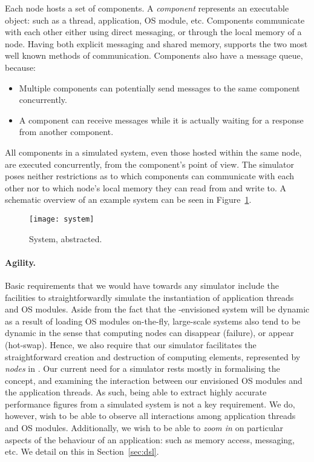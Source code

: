 Each node hosts a set of components.
A \emph{component} represents an executable object: such as a thread, application, OS module, etc.
Components communicate with each other either using direct messaging, or through the local memory of a node.
Having both explicit messaging and shared memory,%
\soosim supports the two most well known methods of communication.
Components also have a message queue, because:
\begin{itemize}
  \item Multiple components can potentially send messages to the same component concurrently.
  \item A component can receive messages while it is actually waiting for a response from another component.
\end{itemize}
All components in a simulated system, even those hosted within the same node, are executed concurrently, from the component's point of view.
The simulator poses neither restrictions as to which components can communicate with each other nor to which node's local memory they can read from and write to.
A schematic overview of an example system can be seen in Figure~\ref{fig:system}.

\begin{figure}
\centering
%
\texttt{[image: system]}
\caption{System, abstracted.}
\label{fig:system}
\end{figure}

\paragraph{Agility.}
Basic requirements that we would have towards any simulator include the facilities to straightforwardly simulate the instantiation of application threads and OS modules.
Aside from the fact that the \soos-envisioned system will be dynamic as a result of loading OS modules on-the-fly, large-scale systems also tend to be dynamic in the sense that computing nodes can disappear (failure), or
appear (hot-swap).
Hence, we also require that our simulator facilitates the straightforward creation and destruction of computing elements, represented by \emph{nodes} in \soosim.
Our current need for a simulator rests mostly in formalising the \soos concept, and examining the interaction between our envisioned OS modules and the application threads.
As such, being able to extract highly accurate performance figures from a simulated system is not a key requirement.
We do, however, wish to be able to observe all interactions among application threads and OS modules.
Additionally, we wish to be able to \emph{zoom in} on particular aspects of the behaviour of an application: such as memory access, messaging, etc.
We detail on this in Section~\ref{sec:dsl}.

